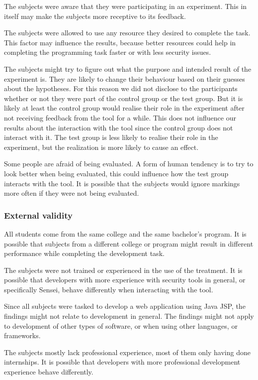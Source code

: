The subjects were aware that they were participating in an experiment.
This in itself may make the subjects more receptive to its feedback.

The subjects were allowed to use any resource they desired to complete the task.
This factor may influence the results, because better resources could help in completing the programming task faster or with less security issues.

The subjects might try to figure out what the purpose and intended result of the experiment is.
They are likely to change their behaviour based on their guesses about the hypotheses.
For this reason we did not disclose to the participants whether or not they were part of the control group or the test group.
But it is likely at least the control group would realise their role in the experiment after not receiving feedback from the tool for a while.
This does not influence our results about the interaction with the tool since the control group does not interact with it.
The test group is less likely to realise their role in the experiment, but the realization is more likely to cause an effect.

Some people are afraid of being evaluated.
A form of human tendency is to try to look better when being evaluated, this could influence how the test group interacts with the tool.
It is possible that the subjects would ignore markings more often if they were not being evaluated.

\subsubsection{External validity}%
All students come from the same college and the same bachelor's program.
It is possible that subjects from a different college or program might result in different performance while completing the development task.

The subjects were not trained or experienced in the use of the treatment.
It is possible that developers with more experience with security tools in general, or specifically Sensei, behave differently when interacting with the tool.

Since all subjects were tasked to develop a web application using Java JSP, the findings might not relate to development in general.
The findings might not apply to development of other types of software, or when using other languages, or frameworks. 

The subjects mostly lack professional experience, most of them only having done internships.
It is possible that developers with more professional development experience behave differently.